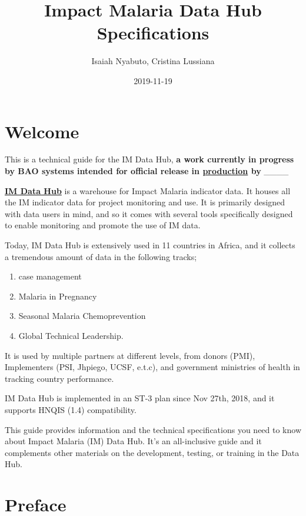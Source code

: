 \documentclass[]{book}
\title{Impact Malaria Data Hub Specifications}
\author{Isaiah Nyabuto, Cristina Lussiana}
\date{2019-11-19}
\providecommand{\tightlist}{%
  \setlength{\itemsep}{0pt}\setlength{\parskip}{0pt}}
\begin{document}
\maketitle

{
\setcounter{tocdepth}{1}
\tableofcontents
}
\hypertarget{welcome}{%
\chapter*{Welcome}\label{welcome}}

This is a technical guide for the IM Data Hub, \textbf{a work currently in progress by BAO systems intended for official release in \href{imdatahub.org}{production} by }\_\_\_\_

\href{imdatahub.org}{\textbf{IM Data Hub}} is a warehouse for Impact Malaria indicator data. It houses all the IM indicator data for project monitoring and use. It is primarily designed with data users in mind, and so it comes with several tools specifically designed to enable monitoring and promote the use of IM data.

Today, IM Data Hub is extensively used in 11 countries in Africa, and it collects a tremendous amount of data in the following tracks;

\begin{enumerate}
\def\labelenumi{\arabic{enumi}.}
\tightlist
\item
  case management
\item
  Malaria in Pregnancy
\item
  Seasonal Malaria Chemoprevention
\item
  Global Technical Leadership.
\end{enumerate}

It is used by multiple partners at different levels, from donors (PMI), Implementers (PSI, Jhpiego, UCSF, e.t.c), and government ministries of health in tracking country performance.

IM Data Hub is implemented in an ST-3 plan since Nov 27th, 2018, and it supports HNQIS (1.4) compatibility.

This guide provides information and the technical specifications you need to know about Impact Malaria (IM) Data Hub. It's an all-inclusive guide and it complements other materials on the development, testing, or training in the Data Hub.

\hypertarget{preface}{%
\chapter*{Preface}\label{preface}}
\end{document}
